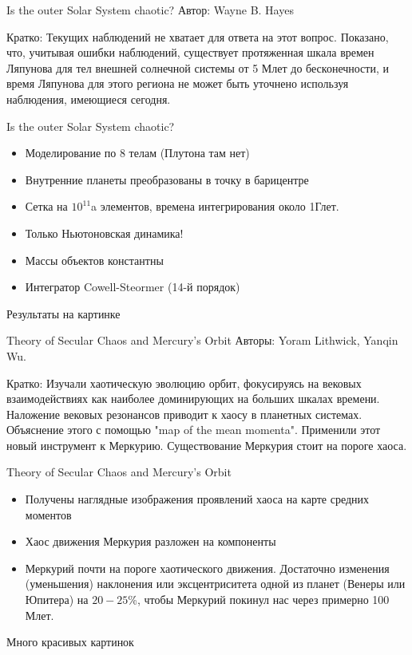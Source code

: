 \documentclass{beamer}
\begin{document}
\begin{frame}{Is the outer Solar System chaotic?}
        Автор: Wayne B. Hayes

        Кратко: Текущих наблюдений не хватает для ответа на этот вопрос. Показано, что, учитывая ошибки наблюдений, существует протяженная шкала времен Ляпунова для тел внешней солнечной системы от 5 Млет до бесконечности, и время Ляпунова для этого региона не может быть уточнено используя наблюдения, имеющиеся сегодня.
\end{frame}


\begin{frame}{Is the outer Solar System chaotic?}
        \begin{itemize}
                \item Моделирование по 8 телам (Плутона там нет)
                \item Внутренние планеты преобразованы в точку в барицентре
                \item Сетка на $10^{11}$a элементов, времена интегрирования около 1Глет.
                \item Только Ньютоновская динамика!
                \item Массы объектов константны
                \item Интегратор Cowell-Steormer (14-й порядок)
        \end{itemize}
        Результаты на картинке
\end{frame}

\begin{frame}{Theory of Secular Chaos and Mercury's Orbit}
        Авторы: Yoram Lithwick, Yanqin Wu.

        Кратко: Изучали хаотическую эволюцию орбит, фокусируясь на вековых взаимодействиях как наиболее доминирующих на больших шкалах времени. Наложение вековых резонансов приводит к хаосу в планетных системах. Объяснение этого с помощью "map of the mean momenta". Применили этот новый инструмент к Меркурию. Существование Меркурия стоит на пороге хаоса.

\end{frame}

\begin{frame}{Theory of Secular Chaos and Mercury's Orbit}
        \begin{itemize}
                \item Получены наглядные изображения проявлений хаоса на карте средних моментов
                \item Хаос движения Меркурия разложен на компоненты
                \item Меркурий почти на пороге хаотического движения. Достаточно изменения (уменьшения) наклонения или эксцентриситета одной из планет (Венеры или Юпитера) на $20 - 25$\%, чтобы Меркурий покинул нас через примерно 100 Млет.
        \end{itemize}
        Много красивых картинок
\end{frame}
\end{document}
